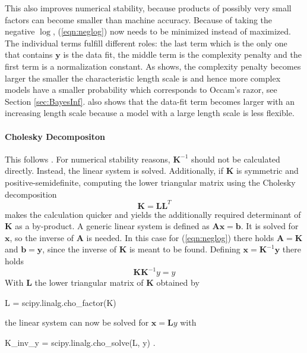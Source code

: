 \documentclass[%
  a4paper,oneside,%
  11pt,%
  smallchapters,
  style=printdev,
  extramargin,
  green,%
  rgb, <cmyk>
  ]{tubsbook}
\begin{document}
This also improves numerical stability, because products of possibly very small factors can become smaller than machine accuracy. 
Because of taking the negative $\log$, (\ref{eqn:neglog}) now needs to be minimized instead of maximized. 
The individual terms fulfill different roles: the last term which is the only one that contains $\bm{y}$ is the data fit, the middle term is the complexity penalty and the first term is a normalization constant. As \cite{rasmussen2006} shows, the complexity penalty becomes larger the smaller the characteristic length scale is and hence more complex models have a smaller probability which corresponds to Occam's razor, see Section \ref{sec:BayesInf}. \cite{rasmussen2006} also shows that the data-fit term becomes larger with an increasing length scale because a model with a large length scale is less flexible.



\paragraph{Cholesky Decompositon}
\label{sec:Cholesky}
This follows \cite[p.93-95]{chambers1998}.
For numerical stability reasons, $\bm{K}^{-1}$ should not be calculated directly. Instead, the linear system is solved. Additionally, if $\bm{K}$ is symmetric and positive-semidefinite, computing the lower triangular matrix using the Cholesky decomposition 
\begin{equation}
\bm{K} = \bm{L}\bm{L}^T
\end{equation}
makes the calculation quicker and yields the additionally required determinant of $\bm{K}$ as a by-product. 
A generic linear system is defined as $\bm{A} \bm{x} = \bm{b}$. It is solved for $\bm{x}$, so the inverse of $\bm{A}$ is needed. In this case for (\ref{eqn:neglog}) there holds $\bm{A}=\bm{K}$ and $\bm{b} = \bm{y}$, since the inverse of $\bm{K}$ is meant to be found. Defining $\bm{x} = \bm{K}^{-1}\bm{y}$ there holds
\begin{equation}
\bm{K} \bm{K}^{-1}  y = y
\end{equation}
%
With $\bm{L}$ the lower triangular matrix of $\bm{K}$ obtained by 
\begin{python}
L = scipy.linalg.cho_factor(K)
\end{python}
the linear system can now be solved for $\bm{x} = \bm{L}y$ with
\begin{python}
K_inv_y = scipy.linalg.cho_solve(L, y) .
\end{python}
\end{document}
